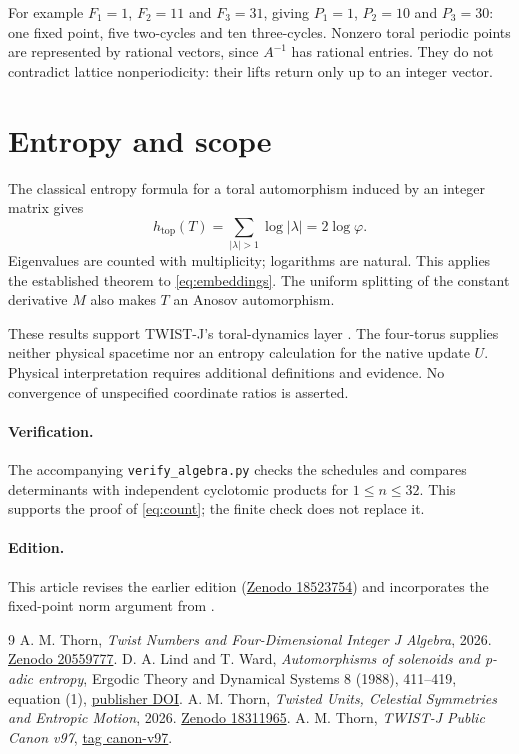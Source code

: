 \documentclass[11pt,a4paper]{article}
\newcommand{\ph}{\varphi}
\begin{document}
For example $F_1=1$, $F_2=11$ and $F_3=31$, giving
$P_1=1$, $P_2=10$ and $P_3=30$: one fixed point, five two-cycles
and ten three-cycles. Nonzero toral periodic points are represented
by rational vectors, since $A^{-1}$ has rational entries. They do
not contradict lattice nonperiodicity: their lifts return only up
to an integer vector.

\section{Entropy and scope}\label{sec:scope}
The classical entropy formula for a toral automorphism induced by
an integer matrix \cite{lindward} gives
\begin{equation}\label{eq:entropy}
 h_{\mathrm{top}}(T)=\sum_{|\lambda|>1}\log|\lambda|
 =2\log\ph.
\end{equation}
Eigenvalues are counted with multiplicity; logarithms are natural.
This applies the established theorem to \eqref{eq:embeddings}.
The uniform splitting of the constant derivative $M$ also makes
$T$ an Anosov automorphism.

These results support TWIST-J's toral-dynamics layer \cite{canon}.
The four-torus supplies neither physical spacetime nor an entropy
calculation for the native update $U$. Physical interpretation
requires additional definitions and evidence. No convergence of
unspecified coordinate ratios is asserted.

\paragraph{Verification.}
The accompanying \texttt{verify\_algebra.py} checks the schedules
and compares determinants with independent cyclotomic products for
$1\leq n\leq32$. This supports the proof of \eqref{eq:count};
the finite check does not replace it.

\paragraph{Edition.}
This article revises the earlier edition
(\href{https://doi.org/10.5281/zenodo.18523754}{Zenodo 18523754})
and incorporates the fixed-point norm argument from \cite{units}.

\begin{thebibliography}{9}
 A. M. Thorn, \emph{Twist Numbers and Four-Dimensional
Integer J Algebra}, 2026.
\href{https://doi.org/10.5281/zenodo.20559777}{Zenodo 20559777}.
 D. A. Lind and T. Ward, \emph{Automorphisms of
solenoids and p-adic entropy}, Ergodic Theory and Dynamical Systems
8 (1988), 411--419, equation (1),
\href{https://doi.org/10.1017/S0143385700004545}{publisher DOI}.
 A. M. Thorn, \emph{Twisted Units, Celestial Symmetries
and Entropic Motion}, 2026.
\href{https://doi.org/10.5281/zenodo.18311965}{Zenodo 18311965}.
 A. M. Thorn, \emph{TWIST-J Public Canon v97},
\href{https://github.com/mathorn1973/twist-j/tree/canon-v97}{tag canon-v97}.
\end{thebibliography}
\end{document}
